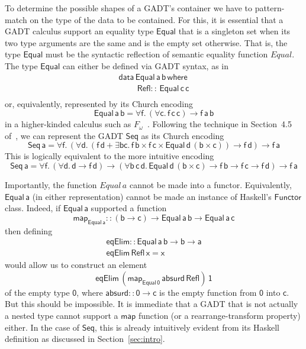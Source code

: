 \documentclass[acmsmall,screen,review,anonymous]{acmart}
\theoremstyle{definition}
\begin{document}
To determine the possible shapes of a GADT's container we have to
pattern-match on the type of the data to be contained. For this, it is
essential that a GADT calculus support an equality type
$\mathsf{Equal}$ that is a singleton set when its two type arguments
are the same and is the empty set otherwise. That is, the type
$\mathsf{Equal}$ must be the syntactic reflection of semantic equality
function $\mathit{Equal}$. The type $\mathsf{Equal}$ can either be
defined via GADT syntax, as in
\[\begin{array}{l}
\mathsf{data\, Equal\,a\,b\,where}\\
\mathsf{\;\;\;\;\;\;\;\;Refl ::\, Equal\,c\,c}\\
\end{array}\]
\noindent
or, equivalently, represented by its Church encoding
\[\mathsf{Equal\,a\,b} = \mathsf{\forall f.\, (\forall c.\,
  f\,c\,c) \to f\,a\,b}\] in a higher-kinded calculus such as
$F_\omega$~\cite{atk12}. Following the technique in Section~4.5
of~\cite{atk12}, we can represent the GADT $\mathsf{Seq}$ as its
Church encoding
\[\mathsf{Seq\,a} = \mathsf{\forall f.\,(\forall d. \,(f\,d + \exists b
  c.\, f\, b \times f \,c \times \mathsf{Equal}\, d \,(b \times c))
  \to f \,d) \to f\, a}\]
This is logically equivalent to the more intuitive encoding
\[\mathsf{Seq\,a} = \mathsf{\forall f.\, (\forall d.\,d \to f\, d)
  \to (\forall b\,c\,d.\,Equal\,d\,(b\times c) \to f\,b \to f\,c \to
  f\,d) \to f\,a}\]


Importantly, the function $\mathit{Equal}\,a$ cannot be made into a
functor. Equivalently, $\mathsf{Equal\,a}$ (in either representation)
cannot be made an instance of Haskell's $\mathsf{Functor}$
class. Indeed, if $\mathsf{Equal\,a}$ supported a function
\[\mathsf{map_{Equal\,a} :: (b \to c) \to Equal\,a\,b \to
  Equal\,a\,c}\]
then defining
\[\begin{array}{l}
\mathsf{eqElim :: Equal\, a\, b \to b \to a}\\
\mathsf{eqElim\, Refl\, x = x} 
\end{array}\]
would allow us to construct
an element
\[\mathsf{eqElim\, (map_{Equal\,0}\, absurd\, Refl)\, 1}\]
of the empty type $\mathsf{0}$, where $\mathsf{absurd :: 0 \to c}$ is
the
empty function from  $\mathsf{0}$
into
$\mathsf{c}$.
But this should be impossible. It is immediate that a GADT that is not
actually a nested type cannot support a $\mathsf{map}$ function (or a
rearrange-transform property) either. In the case of $\mathsf{Seq}$,
this is already intuitively evident from its Haskell definition as
discussed in Section~\ref{sec:intro}.
\end{document}
